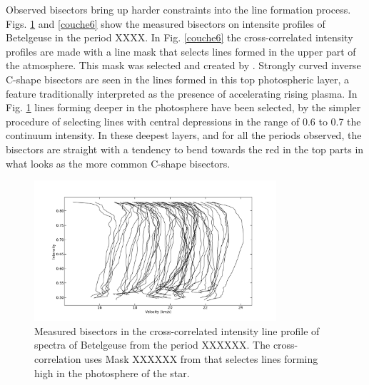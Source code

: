 \documentclass{/Users/art2/TeX/aanda/aa}
\def\kms {km\,s$^{-1}$}
\begin{document}
Observed bisectors bring up harder constraints into the line formation process. Figs. \ref{couche0} and \ref{couche6} show the measured 
bisectors on intensite profiles of Betelgeuse in the period XXXX. In Fig. \ref{couche6} the cross-correlated intensity profiles are made with a
 line mask  that selects lines formed in the upper part of the atmosphere. This mask was selected and created by 
 \cite{kravchenko_tomography_2018}. Strongly curved 
inverse C-shape bisectors are seen in the lines formed in this top photospheric layer, a feature traditionally interpreted as the 
presence of accelerating rising plasma.   In Fig. \ref{couche0} lines forming deeper in the photosphere have been selected, by the simpler 
procedure of selecting lines with central depressions in the range of 0.6 to 0.7 the continuum intensity. In these deepest layers, and 
for all the periods observed, the bisectors are straight with a tendency to bend towards the red in the top parts in what looks as 
the more common C-shape bisectors.
\begin{figure}
   \includegraphics[width=0.8\textwidth]{bissecteurmaskKateryna.png}
   \caption{Measured bisectors in the cross-correlated intensity line profile of spectra of Betelgeuse from the period XXXXXX. The cross-correlation
   uses Mask XXXXXX from \cite{kravchenko_tomography_2018} that selectes lines forming high in the photosphere of the star.}
   \label{couche0}
   \end{figure}
\end{document}
